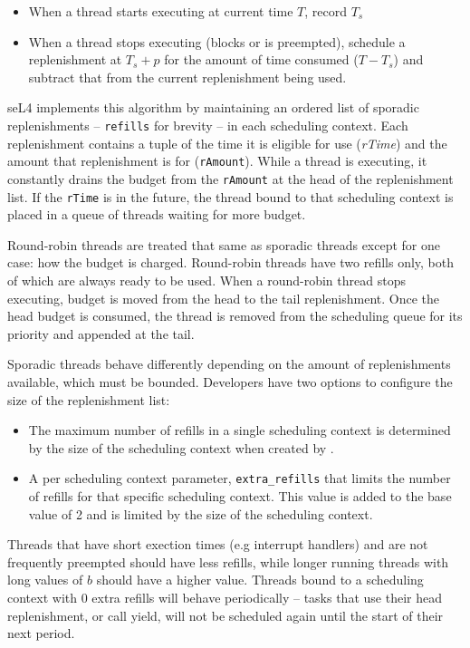 \begin{itemize}
\item When a thread starts executing at current time $T$, record $T_{s}$
\item When a thread stops executing (blocks or is preempted), schedule a replenishment at $T_{s} + p$ for the
amount of time consumed ($T - T_{s}$) and subtract that from the current replenishment being used.
\end{itemize}

seL4 implements this algorithm by maintaining an ordered list of sporadic replenishments --
\texttt{refills} for brevity -- in each scheduling context. Each replenishment contains a tuple
of the time it is eligible for use (\emph{rTime}) and the amount that replenishment is for
(\texttt{rAmount}).
While a thread is executing, it constantly drains the budget from the \texttt{rAmount} at the head of the
replenishment list. If the \texttt{rTime} is in the future, the thread bound to that
scheduling context is placed in a queue of threads waiting for more budget.

Round-robin threads are treated that same as sporadic threads except for one case: how the
budget is charged. Round-robin threads have two refills only, both of which are always ready to be
used. When a round-robin thread stops executing, budget is moved from the head to the tail
replenishment. Once the head budget is consumed, the thread is removed from the scheduling queue
for its priority and appended at the tail.

Sporadic threads behave differently depending on the amount of replenishments available, which
must be bounded. Developers have two options to configure the size of the replenishment list:

\begin{itemize}
\item The maximum number of refills in a single scheduling context is determined by the size
      of the scheduling context when created by .
\item A per scheduling context parameter, \texttt{extra\_refills} that
limits the number of refills for that specific scheduling context. This value is added to the base
value of 2 and is limited by the size of the scheduling context.
\end{itemize}

Threads that have short exection times (e.g interrupt handlers) and are not frequently preempted
should have less refills, while longer running threads with long values of $b$ should have a higher
value. Threads bound to a scheduling context with 0 extra refills will behave periodically -- tasks
that use their head replenishment, or call yield, will not be scheduled again until the start of
their next period.

